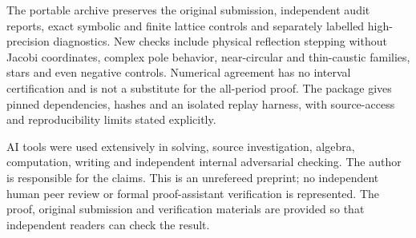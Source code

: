 \documentclass[11pt]{article}
\begin{document}
The portable archive preserves the original submission, independent
audit reports, exact symbolic and finite lattice controls and separately
labelled high-precision diagnostics. New checks include physical
reflection stepping without Jacobi coordinates, complex pole behavior,
near-circular and thin-caustic families, stars and even negative controls.
Numerical agreement has no interval certification and is not a substitute
for the all-period proof. The package gives pinned dependencies, hashes
and an isolated replay harness, with source-access and reproducibility
limits stated explicitly.

AI tools were used extensively in solving, source investigation, algebra,
computation, writing and independent internal adversarial checking.
The author is responsible for the claims. This is an unrefereed preprint;
no independent human peer review or formal proof-assistant verification
is represented. The proof, original submission and verification materials
are provided so that independent readers can check the result.
\end{document}

